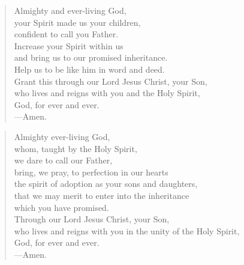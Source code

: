 \prayer

\setlength{\leftmargini}{\prayerleftmargini}

\begin{verse}
Almighty and ever-living God,\\
your Spirit made us your children,\\
confident to call you Father.\\
Increase your Spirit within us\\
and bring us to our promised inheritance.\\
Help us to be like him in word and deed.\\
Grant this through our Lord Jesus Christ, your Son,\\
who lives and reigns with you and the Holy Spirit,\\
God, for ever and ever.\\
{\color{red}---\thinspace}Amen.
\end{verse}


\begin{verse}
Almighty ever-living God,\\
whom, taught by the Holy Spirit,\\
we dare to call our Father,\\
bring, we pray, to perfection in our hearts\\
the spirit of adoption as your sons and daughters,\\
that we may merit to enter into the inheritance\\
which you have promised.\\
Through our Lord Jesus Christ, your Son,\\
who lives and reigns with you in the unity of the Holy Spirit,\\
God, for ever and ever.\\
{\color{red}---\thinspace}Amen.
\end{verse}

\setlength{\leftmargini}{\defleftmargini}